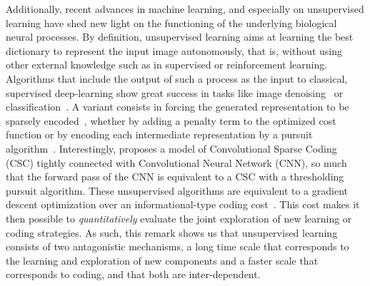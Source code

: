 \documentclass[letterpaper,final,conference,10pt]{IEEEtran}
\newcommand{\citep}[1]{\cite{#1}}
\begin{document}
Additionally, recent advances in machine learning, and especially on unsupervised learning have shed new light on the functioning of the underlying biological neural processes. By definition, unsupervised learning aims at learning the best dictionary to represent the input image autonomously, that is, without using other external knowledge such as in supervised or reinforcement learning. Algorithms that include the output of such a process as the input to classical, supervised deep-learning show great success in tasks like image denoising~\citep{Vincent08} or classification~\citep{Sulam2017multi}. A variant consists in forcing the generated representation to be sparsely encoded~\citep{MakhzaniF13}, whether by adding a penalty term to the optimized cost function or by encoding each intermediate representation by a pursuit algorithm~\citep{Papyan16}. Interestingly, \citep{Papyan16} proposes a model of Convolutional Sparse Coding (CSC) tightly connected with Convolutional Neural Network (CNN), so much that the forward pass of the CNN is equivalent to a CSC with a thresholding pursuit algorithm. These unsupervised algorithms are equivalent to a gradient descent optimization over an informational-type coding cost~\citep{Kingma13}. This cost makes it then possible to \emph{quantitatively} evaluate the joint exploration of new learning or coding strategies. As such, this remark shows us that unsupervised learning consists of two antagonistic mechanisms, a long time scale that corresponds to the learning and exploration of new components and a faster scale that corresponds to coding, and that both are inter-dependent.
\end{document}
